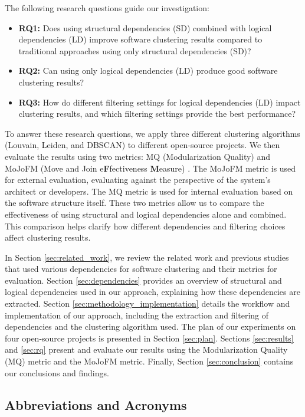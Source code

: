 \documentclass{ieeeaccess}
\begin{document}
The following research questions guide our investigation:

\begin{itemize}
\item \textbf{RQ1:} Does using structural dependencies (SD) combined with logical dependencies (LD) improve software clustering results compared to traditional approaches using only structural dependencies (SD)?
\item \textbf{RQ2:} Can using only logical dependencies (LD) produce good software clustering results?
\item \textbf{RQ3:} How do different filtering settings for logical dependencies (LD) impact clustering results, and which filtering settings provide the best performance?
\end{itemize}

To answer these research questions, we apply three different clustering algorithms (Louvain, Leiden, and DBSCAN) to different open-source projects. We then evaluate the results using two metrics: MQ (Modularization Quality) \cite{b10} and MoJoFM (Move and Join e\textbf{F}fectiveness \textbf{M}easure) \cite{mojofm}. The MoJoFM metric is used for external evaluation, evaluating against the perspective of the system's architect or developers. The MQ metric is used for internal evaluation based on the software structure itself. These two metrics allow us to compare the effectiveness of using structural and logical dependencies alone and combined. This comparison helps clarify how different dependencies and filtering choices affect clustering results.


In Section \ref{sec:related_work}, we review the related work and previous studies that used various dependencies for software clustering and their metrics for evaluation.
Section \ref{sec:dependencies} provides an overview of structural and logical dependencies used in our approach, explaining how these dependencies are extracted.
Section \ref{sec:methodology_implementation} details the workflow and implementation of our approach, including the extraction and filtering of dependencies and the clustering algorithm used.
The plan of our experiments on four open-source projects is presented in Section \ref{sec:plan}. Sections \ref{sec:results} and \ref{sec:rq} present and evaluate our results using the Modularization Quality (MQ) metric and the MoJoFM metric. 
Finally, Section \ref{sec:conclusion} contains our conclusions and findings.

\subsection{Abbreviations and Acronyms}
\end{document}
